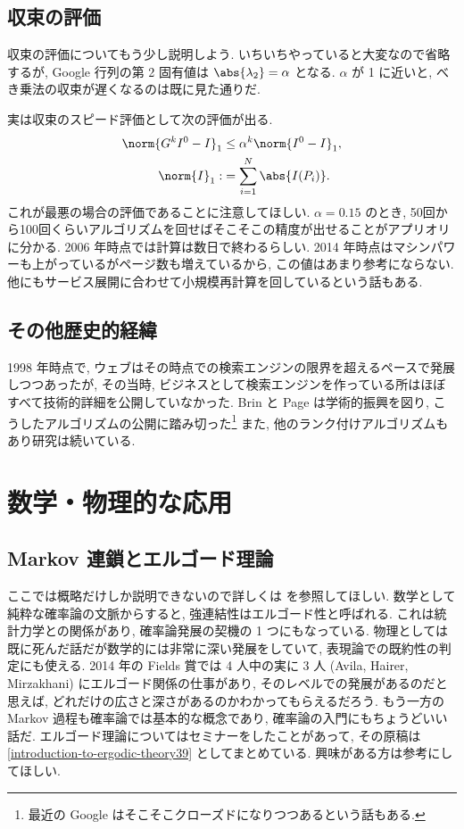 \documentclass[openany, a4paper, oneside]{jsbook}
\begin{document}
\subsection{収束の評価}

収束の評価についてもう少し説明しよう.
いちいちやっていると大変なので省略するが,
Google 行列の第 2 固有値は $\abs{\lambda_2} = \alpha$ となる.
$\alpha$ が 1 に近いと, べき乗法の収束が遅くなるのは既に見た通りだ.

実は収束のスピード評価として次の評価が出る.
\begin{align}
 \norm{ G^k I^0 - I }_1
 &\le
 \alpha^k \norm{I^0 - I}_1, \\
 \norm{I}_1
 :&=
 \sum_{i=1}^N \abs{I(P_i)}.
\end{align}
これが最悪の場合の評価であることに注意してほしい.
$\alpha=0.15$ のとき,
50回から100回くらいアルゴリズムを回せばそこそこの精度が出せることがアプリオリに分かる.
2006 年時点では計算は数日で終わるらしい.
2014 年時点はマシンパワーも上がっているがページ数も増えているから,
この値はあまり参考にならない.
他にもサービス展開に合わせて小規模再計算を回しているという話もある.
\subsection{その他歴史的経緯}

1998 年時点で, ウェブはその時点での検索エンジンの限界を超えるペースで発展しつつあったが,
その当時, ビジネスとして検索エンジンを作っている所はほぼすべて技術的詳細を公開していなかった.
Brin と Page は学術的振興を図り, こうしたアルゴリズムの公開に踏み切った\footnote{最近の Google はそこそこクローズドになりつつあるという話もある.}
また, 他のランク付けアルゴリズムもあり研究は続いている.


\section{数学・物理的な応用}

\subsection{Markov 連鎖とエルゴード理論}

ここでは概略だけしか説明できないので詳しくは \cite[7 節]{TadahisaFunaki1} を参照してほしい.
数学として純粋な確率論の文脈からすると, 強連結性はエルゴード性と呼ばれる.
これは統計力学との関係があり, 確率論発展の契機の 1 つにもなっている.
物理としては既に死んだ話だが数学的には非常に深い発展をしていて, 表現論での既約性の判定にも使える.
2014 年の Fields 賞では 4 人中の実に 3 人 (Avila, Hairer, Mirzakhani) にエルゴード関係の仕事があり,
そのレベルでの発展があるのだと思えば, どれだけの広さと深さがあるのかわかってもらえるだろう.
もう一方の Markov 過程も確率論では基本的な概念であり, 確率論の入門にもちょうどいい話だ.
エルゴード理論についてはセミナーをしたことがあって, その原稿は \ref{introduction-to-ergodic-theory39} としてまとめている.
興味がある方は参考にしてほしい.
\end{document}
